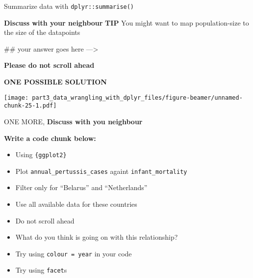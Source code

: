 \documentclass[ignorenonframetext,]{beamer}
\newenvironment{Shaded}{\begin{snugshade}}{\end{snugshade}}
\newcommand{\DataTypeTok}[1]{\textcolor[rgb]{0.13,0.29,0.53}{#1}}
\newcommand{\KeywordTok}[1]{\textcolor[rgb]{0.13,0.29,0.53}{\textbf{#1}}}
\newcommand{\NormalTok}[1]{#1}
\newcommand{\OperatorTok}[1]{\textcolor[rgb]{0.81,0.36,0.00}{\textbf{#1}}}
\newcommand{\StringTok}[1]{\textcolor[rgb]{0.31,0.60,0.02}{#1}}
\providecommand{\tightlist}{%
  \setlength{\itemsep}{0pt}\setlength{\parskip}{0pt}}
\begin{document}
\begin{frame}[fragile]{Summarize data with \texttt{dplyr::summarise()}}
\begin{block}{\textbf{Discuss with your neighbour}}
\textbf{TIP} You might want to map population-size to the size of the
datapoints

\begin{Shaded}
\begin{Highlighting}[]
\NormalTok{## your answer goes here --->}
\end{Highlighting}
\end{Shaded}

\textbf{Please do not scroll ahead}

\end{block}

\begin{block}{\textbf{ONE POSSIBLE SOLUTION}}

\begin{Shaded}
\end{Shaded}

\texttt{[image: part3\_data\_wrangling\_with\_dplyr\_files/figure-beamer/unnamed-chunk-25-1.pdf]}

\end{block}

\begin{block}{ONE MORE, \textbf{Discuss with you neighbour}}

\textbf{Write a code chunk below:}

\begin{itemize}
\tightlist
\item
  Using \texttt{\{ggplot2\}}
\item
  Plot \texttt{annual\_pertussis\_cases} againt
  \texttt{infant\_mortality}
\item
  Filter only for ``Belarus'' and ``Netherlands''
\item
  Use all available data for these countries
\item
  Do not scroll ahead
\item
  What do you think is going on with this relationship?
\item
  Try using \texttt{colour\ =\ year} in your code
\item
  Try using \texttt{facet}s
\end{itemize}


\end{block}
\end{frame}
\end{document}

